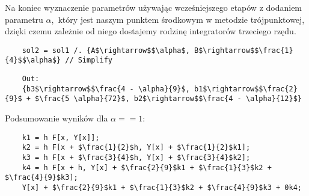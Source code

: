 Na koniec wyznaczenie parametrów używając wcześniejszego etapów z dodaniem parametru $\alpha$,~który jest naszym punktem środkowym w metodzie trójpunktowej, dzięki czemu zależnie od niego dostajemy rodzinę integratorów trzeciego rzędu.
\begin{lstlisting}
    sol2 = sol1 /. {A$\rightarrow$$\alpha$, B$\rightarrow$$\frac{1}{4}$$\alpha$} // Simplify
\end{lstlisting}
\begin{lstlisting}
    Out:
    {b3$\rightarrow$$\frac{4 - \alpha}{9}$, b1$\rightarrow$$\frac{2}{9}$ + $\frac{5 \alpha}{72}$, b2$\rightarrow$$\frac{4 - \alpha}{12}$}
\end{lstlisting}
Podsumowanie wyników dla $\alpha==1$:
\begin{lstlisting}
    k1 = h F[x, Y[x]];
    k2 = h F[x + $\frac{1}{2}$h, Y[x] + $\frac{1}{2}$k1];
    k3 = h F[x + $\frac{3}{4}$h, Y[x] + $\frac{3}{4}$k2];
    k4 = h F[x + h, Y[x] + $\frac{2}{9}$k1 + $\frac{1}{3}$k2 + $\frac{4}{9}$k3];
    Y[x] + $\frac{2}{9}$k1 + $\frac{1}{3}$k2 + $\frac{4}{9}$k3 + 0k4;
\end{lstlisting}

